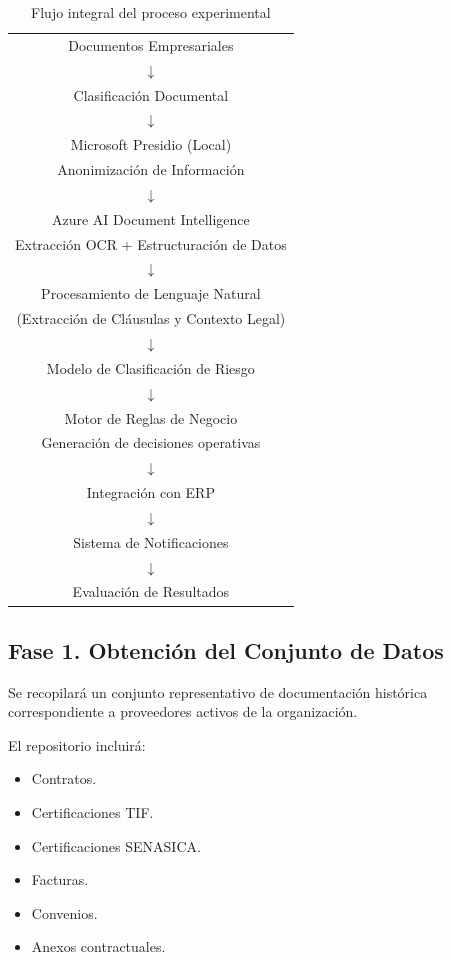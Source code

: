 \documentclass[12pt]{article}
\begin{document}
\begin{table}[H]
\centering
\caption{Flujo integral del proceso experimental} 
\vspace{0.3cm}
\label{tab:flujo-integral-proceso}
\begin{tabular}{c}
Documentos Empresariales \\
$\downarrow$ \\
Clasificación Documental \\
$\downarrow$ \\
Microsoft Presidio (Local) \\
Anonimización de Información \\
$\downarrow$ \\
Azure AI Document Intelligence \\
Extracción OCR + Estructuración de Datos \\
$\downarrow$ \\
Procesamiento de Lenguaje Natural \\
(Extracción de Cláusulas y Contexto Legal) \\
$\downarrow$ \\
Modelo de Clasificación de Riesgo \\
$\downarrow$ \\
Motor de Reglas de Negocio \\
Generación de decisiones operativas \\
$\downarrow$ \\
Integración con ERP \\
$\downarrow$ \\
Sistema de Notificaciones \\
$\downarrow$ \\
Evaluación de Resultados
\end{tabular}
\end{table}

\subsection{Fase 1. Obtención del Conjunto de Datos}
Se recopilará un conjunto representativo de documentación histórica correspondiente a proveedores activos de la organización.

El repositorio incluirá:

\begin{itemize}
    \item Contratos.
    \item Certificaciones TIF.
    \item Certificaciones SENASICA.
    \item Facturas.
    \item Convenios.
    \item Anexos contractuales.
\end{itemize}
\end{document}
